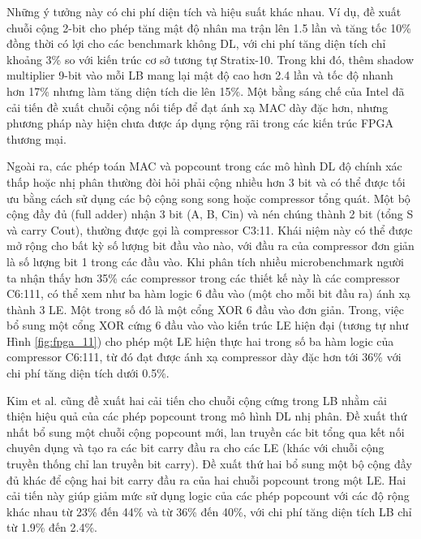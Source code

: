 \documentclass[a4paper]{article}
\begin{document}
Những ý tưởng này có chi phí diện tích và hiệu suất khác nhau. Ví dụ, đề xuất chuỗi cộng 2-bit cho phép tăng mật độ nhân ma trận lên 1.5 lần và tăng tốc 10\% đồng thời có lợi cho các benchmark không DL, với chi phí tăng diện tích chỉ khoảng 3\% so với kiến trúc cơ sở tương tự Stratix-10. Trong khi đó, thêm shadow multiplier 9-bit vào mỗi LB mang lại mật độ cao hơn 2.4 lần và tốc độ nhanh hơn 17\% nhưng làm tăng diện tích die lên 15\%. Một bằng sáng chế của Intel đã cải tiến đề xuất chuỗi cộng nối tiếp để đạt ánh xạ MAC dày đặc hơn, nhưng phương pháp này hiện chưa được áp dụng rộng rãi trong các kiến trúc FPGA thương mại.

Ngoài ra, các phép toán MAC và popcount trong các mô hình DL độ chính xác thấp hoặc nhị phân thường đòi hỏi phải cộng nhiều hơn 3 bit và có thể được tối ưu bằng cách sử dụng các bộ cộng song song hoặc compressor tổng quát. Một bộ cộng đầy đủ (full adder) nhận 3 bit (A, B, Cin) và nén chúng thành 2 bit (tổng S và carry Cout), thường được gọi là compressor C3:11. Khái niệm này có thể được mở rộng cho bất kỳ số lượng bit đầu vào nào, với đầu ra của compressor đơn giản là số lượng bit 1 trong các đầu vào. Khi phân tích nhiều microbenchmark người ta nhận thấy hơn 35\% các compressor trong các thiết kế này là các compressor C6:111, có thể xem như ba hàm logic 6 đầu vào (một cho mỗi bit đầu ra) ánh xạ thành 3 LE. Một trong số đó là một cổng XOR 6 đầu vào đơn giản. Trong, việc bổ sung một cổng XOR cứng 6 đầu vào vào kiến trúc LE hiện đại (tương tự như Hình \ref{fig:fpga_11}) cho phép một LE hiện thực hai trong số ba hàm logic của compressor C6:111, từ đó đạt được ánh xạ compressor dày đặc hơn tới 36\% với chi phí tăng diện tích dưới 0.5\%.

Kim et al. cũng đề xuất hai cải tiến cho chuỗi cộng cứng trong LB nhằm cải thiện hiệu quả của các phép popcount trong mô hình DL nhị phân. Đề xuất thứ nhất bổ sung một chuỗi cộng popcount mới, lan truyền các bit tổng qua kết nối chuyên dụng và tạo ra các bit carry đầu ra cho các LE (khác với chuỗi cộng truyền thống chỉ lan truyền bit carry). Đề xuất thứ hai bổ sung một bộ cộng đầy đủ khác để cộng hai bit carry đầu ra của hai chuỗi popcount trong một LE. Hai cải tiến này giúp giảm mức sử dụng logic của các phép popcount với các độ rộng khác nhau từ 23\% đến 44\% và từ 36\% đến 40\%, với chi phí tăng diện tích LB chỉ từ 1.9\% đến 2.4\%.
 
\end{document}
